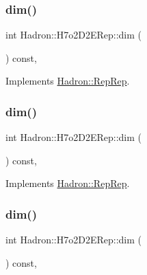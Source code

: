 \subsubsection{\texorpdfstring{dim()}{dim()}\hspace{0.1cm}{\footnotesize\ttfamily [3/5]}}
{\footnotesize\ttfamily int Hadron\+::\+H7o2\+D2\+E\+Rep\+::dim (\begin{DoxyParamCaption}{ }\end{DoxyParamCaption}) const\hspace{0.3cm}{\ttfamily [inline]}, {\ttfamily [virtual]}}



Implements \mbox{\hyperlink{structHadron_1_1RepRep_a92c8802e5ed7afd7da43ccfd5b7cd92b}{Hadron\+::\+Rep\+Rep}}.

\mbox{\label{structHadron_1_1H7o2D2ERep_a0d67fbc1ec1b377b33be3e38873e0732}} 
\subsubsection{\texorpdfstring{dim()}{dim()}\hspace{0.1cm}{\footnotesize\ttfamily [4/5]}}
{\footnotesize\ttfamily int Hadron\+::\+H7o2\+D2\+E\+Rep\+::dim (\begin{DoxyParamCaption}{ }\end{DoxyParamCaption}) const\hspace{0.3cm}{\ttfamily [inline]}, {\ttfamily [virtual]}}



Implements \mbox{\hyperlink{structHadron_1_1RepRep_a92c8802e5ed7afd7da43ccfd5b7cd92b}{Hadron\+::\+Rep\+Rep}}.

\mbox{\label{structHadron_1_1H7o2D2ERep_a0d67fbc1ec1b377b33be3e38873e0732}} 
\subsubsection{\texorpdfstring{dim()}{dim()}\hspace{0.1cm}{\footnotesize\ttfamily [5/5]}}
{\footnotesize\ttfamily int Hadron\+::\+H7o2\+D2\+E\+Rep\+::dim (\begin{DoxyParamCaption}{ }\end{DoxyParamCaption}) const\hspace{0.3cm}{\ttfamily [inline]}, {\ttfamily [virtual]}}



